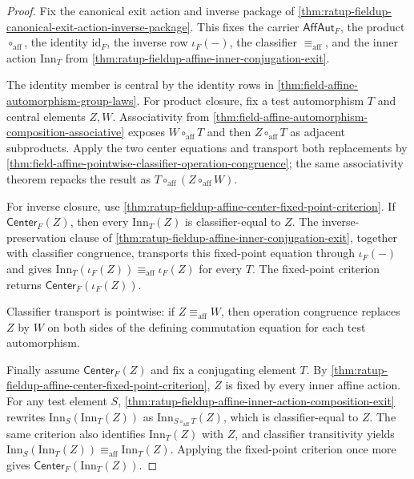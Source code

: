 \begin{proof}
Fix the canonical exit action and inverse package of
\autoref{thm:ratup-fieldup-canonical-exit-action-inverse-package}. This fixes
the carrier $\mathsf{AffAut}_F$, the product $\circ_{\mathrm{aff}}$, the
identity $\mathrm{id}_F$, the inverse row $\iota_F(-)$, the classifier
$\equiv_{\mathrm{aff}}$, and the inner action $\mathrm{Inn}_T$ from
\autoref{thm:ratup-fieldup-affine-inner-conjugation-exit}.

The identity member is central by the identity rows in
\autoref{thm:field-affine-automorphism-group-laws}. For product closure, fix a
test automorphism $T$ and central elements $Z,W$. Associativity from
\autoref{thm:field-affine-automorphism-composition-associative} exposes
$W\circ_{\mathrm{aff}}T$ and then $Z\circ_{\mathrm{aff}}T$ as adjacent
subproducts. Apply the two center equations and transport both replacements by
\autoref{thm:field-affine-pointwise-classifier-operation-congruence}; the same
associativity theorem repacks the result as
$T\circ_{\mathrm{aff}}(Z\circ_{\mathrm{aff}}W)$.

For inverse closure, use
\autoref{thm:ratup-fieldup-affine-center-fixed-point-criterion}. If
$\mathsf{Center}_F(Z)$, then every $\mathrm{Inn}_T(Z)$ is classifier-equal to
$Z$. The inverse-preservation clause of
\autoref{thm:ratup-fieldup-affine-inner-conjugation-exit}, together with
classifier congruence, transports this fixed-point equation through
$\iota_F(-)$ and gives
$\mathrm{Inn}_T(\iota_F(Z))\equiv_{\mathrm{aff}}\iota_F(Z)$ for every $T$.
The fixed-point criterion returns $\mathsf{Center}_F(\iota_F(Z))$.

Classifier transport is pointwise: if $Z\equiv_{\mathrm{aff}}W$, then
operation congruence replaces $Z$ by $W$ on both sides of the defining
commutation equation for each test automorphism.

Finally assume $\mathsf{Center}_F(Z)$ and fix a conjugating element $T$. By
\autoref{thm:ratup-fieldup-affine-center-fixed-point-criterion}, $Z$ is fixed
by every inner affine action. For any test element $S$,
\autoref{thm:ratup-fieldup-affine-inner-action-composition-exit} rewrites
$\mathrm{Inn}_S(\mathrm{Inn}_T(Z))$ as
$\mathrm{Inn}_{S\circ_{\mathrm{aff}}T}(Z)$, which is classifier-equal to $Z$.
The same criterion also identifies $\mathrm{Inn}_T(Z)$ with $Z$, and classifier
transitivity yields
$\mathrm{Inn}_S(\mathrm{Inn}_T(Z))\equiv_{\mathrm{aff}}\mathrm{Inn}_T(Z)$.
Applying the fixed-point criterion once more gives
$\mathsf{Center}_F(\mathrm{Inn}_T(Z))$.
\end{proof}



